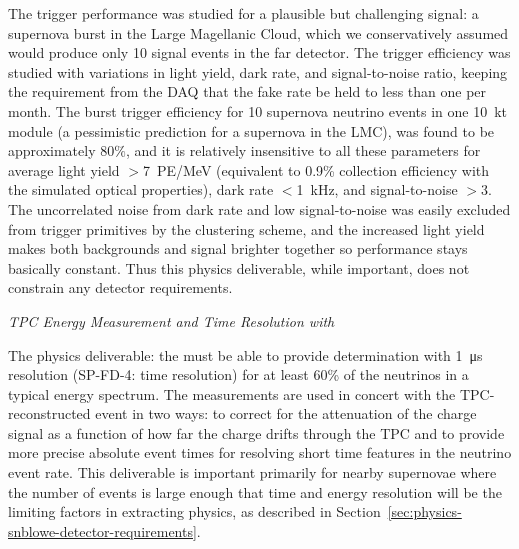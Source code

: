 
The  trigger performance was studied for a plausible but challenging signal: a supernova burst in the Large Magellanic Cloud, which we conservatively assumed would produce only 10 signal events in the far detector. The trigger efficiency was studied with variations in light yield, dark rate, and signal-to-noise ratio, keeping the requirement from the DAQ that the fake rate be held to less than one per month. The burst trigger efficiency for 10 supernova neutrino events in one \SI{10}{kt} module (a  pessimistic prediction for a supernova in the LMC), was found to be approximately $80\%$, and it is relatively insensitive to all these parameters for average light yield $>$\SI{7}{PE/MeV} (equivalent to 0.9\% collection efficiency with the simulated optical properties), dark rate $<$\SI{1}{kHz}, and signal-to-noise $>3$. The uncorrelated noise from dark rate and low signal-to-noise was easily excluded from trigger primitives by the clustering scheme, and the increased light yield makes both backgrounds and signal brighter together so performance stays basically constant. Thus this physics deliverable, while important, does not constrain any detector requirements.


\textit{TPC Energy Measurement and Time Resolution with \tzero}\nopagebreak


The physics deliverable: the  must be able to provide \tzero determination with \SI{1}{\micro s} resolution (SP-FD-4: time resolution) for at least 60\% of the neutrinos in a typical  energy spectrum. The \tzero measurements are used in concert with the TPC-reconstructed event in two ways: to correct for the attenuation of the charge signal as a function of how far the charge drifts through the TPC and to provide more precise absolute event times for resolving short time features in the  neutrino event rate. This deliverable is important primarily for nearby supernovae where the number of events is large enough that time and energy resolution will be the limiting factors in extracting physics, as described in Section~\ref{sec:physics-snblowe-detector-requirements}. 

